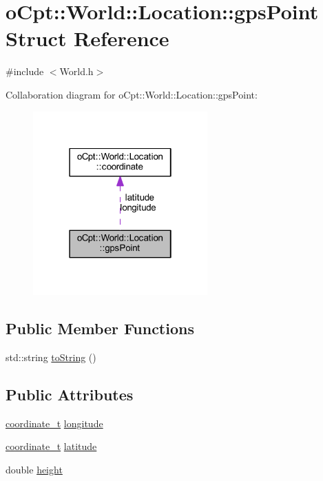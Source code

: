 \hypertarget{structo_cpt_1_1_world_1_1_location_1_1gps_point}{}\section{o\+Cpt\+:\+:World\+:\+:Location\+:\+:gps\+Point Struct Reference}
\label{structo_cpt_1_1_world_1_1_location_1_1gps_point}


{\ttfamily \#include $<$World.\+h$>$}



Collaboration diagram for o\+Cpt\+:\+:World\+:\+:Location\+:\+:gps\+Point\+:\nopagebreak
\begin{figure}[H]
\begin{center}
\leavevmode
\includegraphics[width=190pt]{structo_cpt_1_1_world_1_1_location_1_1gps_point__coll__graph}
\end{center}
\end{figure}
\subsection*{Public Member Functions}
\begin{DoxyCompactItemize}
\item 
std\+::string \hyperlink{structo_cpt_1_1_world_1_1_location_1_1gps_point_a6274bfccaa6be97f2146ab7805ada0af}{to\+String} ()
\end{DoxyCompactItemize}
\subsection*{Public Attributes}
\begin{DoxyCompactItemize}
\item 
\hyperlink{classo_cpt_1_1_world_1_1_location_ade9263a17c41b7af085dfcb9055b18f3}{coordinate\+\_\+t} \hyperlink{structo_cpt_1_1_world_1_1_location_1_1gps_point_a043e3f4795590cee2c41df63769c3b17}{longitude}
\item 
\hyperlink{classo_cpt_1_1_world_1_1_location_ade9263a17c41b7af085dfcb9055b18f3}{coordinate\+\_\+t} \hyperlink{structo_cpt_1_1_world_1_1_location_1_1gps_point_a28047329a2c8750f2d6c54dfa3ce8bb4}{latitude}
\item 
double \hyperlink{structo_cpt_1_1_world_1_1_location_1_1gps_point_a94635e1477d9136f9cbb54fa8fa1fa39}{height}
\end{DoxyCompactItemize}


